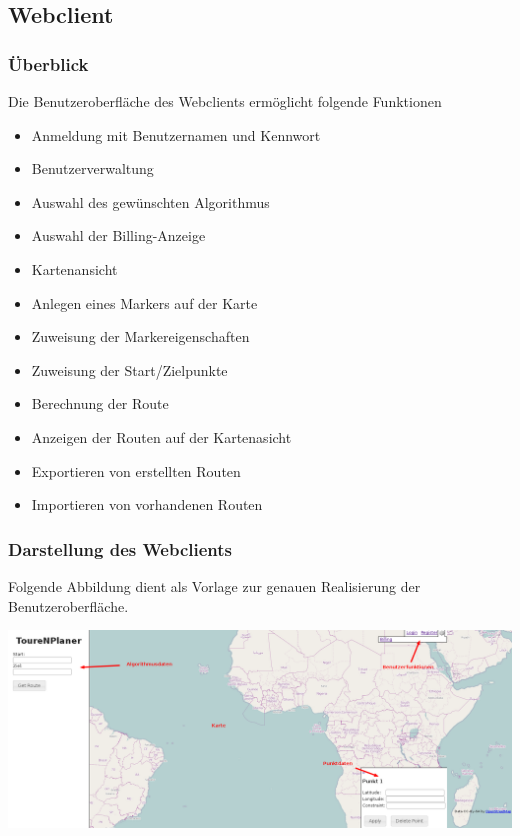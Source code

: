 \documentclass[a4paper,10pt,titlepage]{article}
\begin{document}
\subsection{Webclient}

\subsubsection{Überblick}
Die Benutzeroberfläche des Webclients ermöglicht folgende Funktionen
\begin{itemize}
\item Anmeldung mit Benutzernamen und Kennwort
\item Benutzerverwaltung
\item Auswahl des gewünschten Algorithmus
\item Auswahl der Billing-Anzeige 
\item Kartenansicht
\item Anlegen eines Markers auf der Karte
\item Zuweisung der Markereigenschaften
\item Zuweisung der Start/Zielpunkte
\item Berechnung der Route
\item Anzeigen der Routen auf der Kartenasicht
\item Exportieren von erstellten Routen
\item Importieren von vorhandenen Routen
\end{itemize}

\subsubsection{Darstellung des Webclients}
Folgende Abbildung dient als Vorlage zur genauen Realisierung der Benutzeroberfläche.

\includegraphics[scale=0.30]{media/web/Index.png} 
\end{document}
